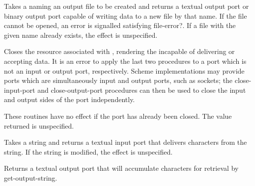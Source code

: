 \begin{entry}{%
}

Takes a  naming an output file to be created and returns a
textual output port or binary output port capable of writing
data to a new file by that name.  If the file cannot be opened,
an error is signalled satisfying {\cf file-error?}.
If a file with the given name already exists,
the effect is unspecified.

\end{entry}


\begin{entry}{%
}

Closes the resource associated with , rendering the 
incapable of delivering or accepting data.  
It is an error
to apply the last two procedures to a port which is not an input
or output port, respectively.
Scheme implementations may provide ports which are simultaneously
input and output ports, such as sockets; the {\cf close-input-port}
and {\cf close-output-port} procedures can then be used to close the
input and output sides of the port independently.

These routines have no effect if the port has already been closed.
The value returned is unspecified.


\end{entry}

\begin{entry}{%
}

Takes a string and returns a textual input port that delivers
characters from the string.
If the string is modified, the effect is unspecified.

\end{entry}

\begin{entry}{%
}

Returns a textual output port that will accumulate characters for
retrieval by {\cf get-output-string}.

\end{entry}

